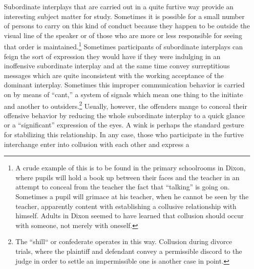 \documentclass[openany,nobib]{tufte-book}
\begin{document}
\newpage Subordinate interplays that are carried out in a quite furtive way
provide an interesting subject matter for study. Sometimes it is
possible for a small number of persons to carry on this kind of conduct
because they happen to be outside the visual line of the speaker or of
those who are more or less responsible for seeing that order is
maintained.\footnote{A crude example of this is to be found in the
  primary schoolrooms in Dixon, where pupils will hold a book up between
  their faces and the teacher in an attempt to conceal from the teacher
  the fact that ``talking'' is going on. Sometimes a pupil will grimace
  at his teacher, when he cannot be seen by the teacher, apparently
  content with establishing a collusive relationship with himself.
  Adults in Dixon seemed to have learned that collusion should occur
  with someone, not merely with oneself.} Sometimes participants of
subordinate interplays can feign the sort of expression they would have
if they were indulging in an inoffensive subordinate interplay and at
the same time convey surreptitious messages which are quite inconsistent
with the working acceptance of the dominant interplay. Sometimes this
improper communication behavior is carried on by means of ``cant,'' a
system of signals which mean one thing to the initiate and another to
outsiders.\footnote{The ``shill`` or confederate operates in this way.
  Collusion during divorce trials, where the plaintiff and defendant
  convey a permissible discord to the judge in order to settle an
  impermissible one is another case in point.} Usually, however, the
offenders mange to conceal their offensive behavior by reducing the
whole subordinate interplay to a quick glance or a ``significant''
expression of the eyes. A wink is perhaps the standard gesture for
stabilizing this relationship. In any case, those who participate in the
furtive interchange enter into collusion with each other and express a
\end{document}
